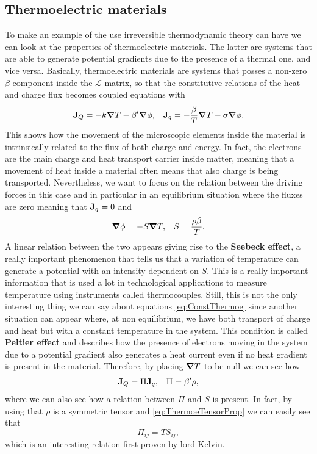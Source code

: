 \subsection{Thermoelectric materials}

To make an example of the use irreversible thermodynamic theory can have we can look at the properties of thermoelectric materials. The latter are systems that are able to generate potential gradients due to the presence of a thermal one, and vice versa. Basically, thermoelectric materials are systems that posses a non-zero $\beta$ component inside the $\mathcal{L}$ matrix, so that the constitutive relations of the heat and charge flux becomes coupled equations with
\begin{align}
    \label{eq:ConstThermoe}
    &\vb{J}_Q = -k\grad T - \beta'\grad \phi, &\vb{J}_q = -\frac{\beta}{T}\grad T - \sigma\grad \phi.
\end{align}
This shows how the movement of the microscopic elements inside the material is intrinsically related to the flux of both charge and energy. In fact, the electrons are the main charge and heat transport carrier inside matter, meaning that a movement of heat inside a material often means that also charge is being transported. Nevertheless, we want to focus on the relation between the driving forces in this case and in particular in an equilibrium situation where the fluxes are zero meaning that $\vb{J}_q = 0$ and
\begin{align}
    &\grad \phi = -S\grad T, &S = \frac{\rho\beta}{T}.
\end{align}
A linear relation between the two appears giving rise to the \textbf{Seebeck effect}, a really important phenomenon that tells us that a variation of temperature can generate a potential with an intensity dependent on $S$. This is a really important information that is used a lot in technological applications to measure temperature using instruments called thermocouples. Still, this is not the only interesting thing we can say about equations \eqref{eq:ConstThermoe} since another situation can appear where, at non equilibrium, we have both transport of charge and heat but with a constant temperature in the system. This condition is called \textbf{Peltier effect} and describes how the presence of electrons moving in the system due to a potential gradient also generates a heat current even if no heat gradient is present in the material. Therefore, by placing $\grad T$ to be null we can see how
\begin{align}
    &\vb{J}_Q = \Pi\vb{J}_q, &\Pi = \beta'\rho,
\end{align}
where we can also see how a relation between $\Pi$ and $S$ is present. In fact, by using that $\rho$ is a symmetric tensor and \eqref{eq:ThermoeTensorProp} we can easily see that
\begin{equation}
    \Pi_{ij} = TS_{ij},
\end{equation}
which is an interesting relation first proven by lord Kelvin.